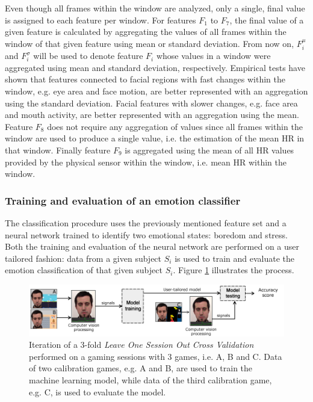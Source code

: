 Even though all frames within the window are analyzed, only a single, final value is assigned to each feature per window. For features $F_1$ to $F_7$, the final value of a given feature is calculated by aggregating the values of all frames within the window of that given feature using mean or standard deviation. From now on, $F_i^\mu$ and $F_i^\sigma$ will be used to denote feature $F_i$ whose values in a window were aggregated using mean and standard deviation, respectively. Empirical tests have shown that features connected to facial regions with fast changes within the window, e.g. eye area and face motion, are better represented with an aggregation using the standard deviation. Facial features with slower changes, e.g. face area and mouth activity, are better represented with an aggregation using the mean. Feature $F_8$ does not require any aggregation of values since all frames within the window are used to produce a single value, i.e. the estimation of the mean HR in that window. Finally feature $F_9$ is aggregated using the mean of all HR values provided by the physical sensor within the window, i.e. mean HR within the window.

\subsubsection{Training and evaluation of an emotion classifier}
\label{s:experiment1-study5-training-evaluation}

The classification procedure uses the previously mentioned feature set and a neural network trained to identify two emotional states: boredom and stress. Both the training and evaluation of the neural network are performed on a user tailored fashion: data from a given subject $S_i$ is used to train and evaluate the emotion classification of that given subject $S_i$. Figure \ref{fig:study5-training-evaluation} illustrates the process.

\begin{figure}[ht]
    \centering
    \includegraphics[width=\textwidth]{figures/machine-learning-investigation.png}
    \caption{Iteration of a 3-fold \textit{Leave One Session Out Cross Validation} performed on a gaming sessions with 3 games, i.e. A, B and C. Data of two calibration games, e.g. A and B, are used to train the machine learning model, while data of the third calibration game, e.g. C, is used to evaluate the model.}
    \label{fig:study5-training-evaluation}
\end{figure}

